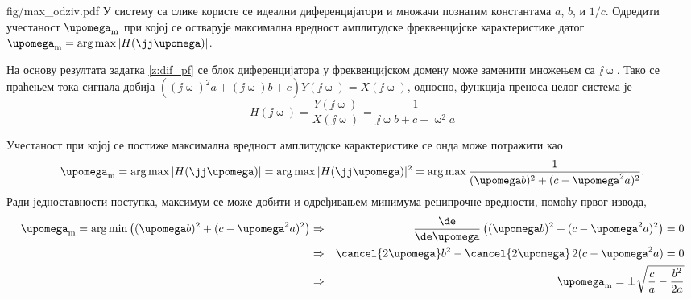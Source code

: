 \noindent
\begin{slikaDesno}{fig/max_odziv.pdf}
    \PID 
    У систему са слике користе се идеални диференцијатори и множачи познатим 
    константама $a$, $b$, и $1/c$. 
    Одредити учестаност $\upomega_{\rm m}$ при којој се остварује максимална 
    вредност амплитудске фреквенцијске карактеристике датог 
    $\upomega_{\rm m} = \arg \max |H(\jj\upomega)|$.     
\end{slikaDesno}

\RESENJE

На основу резултата задатка \ref{z:dif_pf} се блок диференцијатора у фреквенцијском домену може заменити множењем са 
$\jj\upomega$. Тако се праћењем тока сигнала добија 
$((\jj\upomega)^2 a + (\jj \upomega) b  + c) Y(\jj\upomega) = X(\jj\upomega)$, односно, функција преноса целог система је
\begin{equation}
    H(\jj\upomega) = 
    \dfrac{Y(\jj\upomega)}{X(\jj\upomega)} = \dfrac{1}{  \jj \upomega b  + c - \upomega^2 a}
\end{equation}

Учестаност при којој се постиже максимална вредност амплитудске карактеристике се онда може потражити као 
\begin{equation}
    \upomega_{\rm m} = \arg \max |H(\jj\upomega)| = \arg \max |H(\jj\upomega)|^2 = \arg \max \dfrac{1}{ (\upomega b)^2 + ( c - \upomega^2 a )^2 }.
\end{equation}
Ради једноставности поступка, максимум се може добити и одређивањем минимума реципрочне вредности, помоћу првог извода, 
\begin{eqnarray}
    \upomega_{\rm m} = \arg \min \left(   (\upomega b)^2 + ( c - \upomega^2 a )^2  \right) 
    &\Rightarrow&
    \dfrac{\de }{\de \upomega} \left(   (\upomega b)^2 + ( c - \upomega^2 a )^2  \right) = 0 \\
    &\Rightarrow&
    \cancel{2\upomega} b^2 - \cancel{2\upomega} \, 2 (c - \upomega^2 a) = 0 \\
    &\Rightarrow&
    \upomega_{\rm m} = \pm \sqrt{ \dfrac{c}{a} - \dfrac{b^2}{2a}  }
\end{eqnarray}